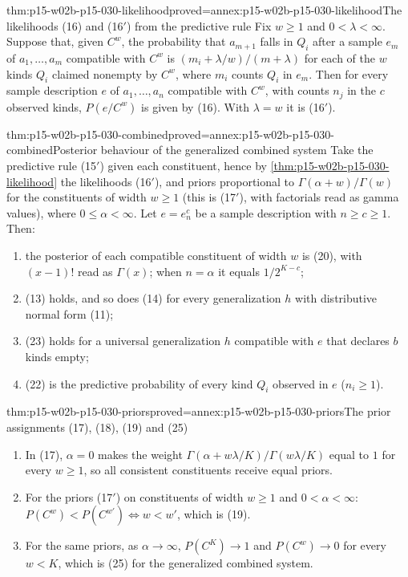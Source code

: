 \begin{hbtheorem}{thm:p15-w02b-p15-030-likelihood}{proved=annex:p15-w02b-p15-030-likelihood}{The likelihoods (16) and (16\('\)) from the predictive rule}
Fix \(w\geq1\) and \(0<\lambda<\infty\). Suppose that, given \(C^w\), the
probability that \(a_{m+1}\) falls in \(Q_i\) after a sample \(e_m\) of
\(a_1,\ldots,a_m\) compatible with \(C^w\) is
\((m_i+\lambda/w)/(m+\lambda)\) for each of the \(w\) kinds \(Q_i\)
claimed nonempty by \(C^w\), where \(m_i\) counts \(Q_i\) in \(e_m\). Then for
every sample description \(e\) of \(a_1,\ldots,a_n\) compatible with
\(C^w\), with counts \(n_j\) in the \(c\) observed kinds, \(P(e/C^w)\) is
given by (16). With \(\lambda=w\) it is (16\('\)).
\end{hbtheorem}

\begin{hbtheorem}{thm:p15-w02b-p15-030-combined}{proved=annex:p15-w02b-p15-030-combined}{Posterior behaviour of the generalized combined system}
Take the predictive rule (15\('\)) given each constituent, hence by
\cref{thm:p15-w02b-p15-030-likelihood} the likelihoods (16\('\)), and priors proportional to
\(\Gamma(\alpha+w)/\Gamma(w)\) for the constituents of width \(w\geq1\)
(this is (17\('\)), with factorials read as gamma values), where
\(0\leq\alpha<\infty\). Let \(e=e^c_n\) be a sample description with
\(n\geq c\geq1\). Then:
\begin{enumerate}
\item the posterior of each compatible constituent of width \(w\) is (20),
  with \((x-1)!\) read as \(\Gamma(x)\); when \(n=\alpha\) it equals
  \(1/2^{K-c}\);
\item (13) holds, and so does (14) for every generalization \(h\) with
  distributive normal form (11);
\item (23) holds for a universal generalization \(h\) compatible with
  \(e\) that declares \(b\) kinds empty;
\item (22) is the predictive probability of every kind \(Q_i\) observed
  in \(e\) (\(n_i\geq1\)).
\end{enumerate}
\end{hbtheorem}

\begin{hbtheorem}{thm:p15-w02b-p15-030-priors}{proved=annex:p15-w02b-p15-030-priors}{The prior assignments (17), (18), (19) and (25)}
\begin{enumerate}
\item In (17), \(\alpha=0\) makes the weight
  \(\Gamma(\alpha+w\lambda/K)/\Gamma(w\lambda/K)\) equal to \(1\) for every
  \(w\geq1\), so all consistent constituents receive equal priors.
\item For the priors (17\('\)) on constituents of width \(w\geq1\) and
  \(0<\alpha<\infty\): \(P(C^w)<P(C^{w'})\iff w<w'\), which is (19).
\item For the same priors, as \(\alpha\to\infty\), \(P(C^K)\to1\) and
  \(P(C^w)\to0\) for every \(w<K\), which is (25) for the generalized
  combined system.
\end{enumerate}
\end{hbtheorem}

